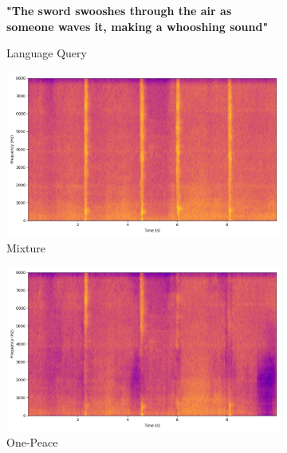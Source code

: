 \begin{figure}[htbp]
    \begin{subfigure}[b]{0.185\textwidth}
        \centering
        \scriptsize\textbf{"The sword swooshes through the air as someone waves it, making a whooshing sound"}
        \vspace{5.0mm}
        \caption*{Language Query}
    \end{subfigure}
    \begin{subfigure}[b]{0.185\textwidth}
        \centering
        \includegraphics[width=\textwidth]{plots/sword_swoosh/clap mixture_spectrogram.png}
        \centering
        \caption*{Mixture}
    \end{subfigure}
    \begin{subfigure}[b]{0.185\textwidth}
        \centering
        \includegraphics[width=\textwidth]{plots/sword_swoosh/onepeace sep_spectrogram.png}
        \caption*{One-Peace}
    \end{subfigure}
    \begin{subfigure}[b]{0.185\textwidth}
        \centering

\end{subfigure}
\end{figure}
